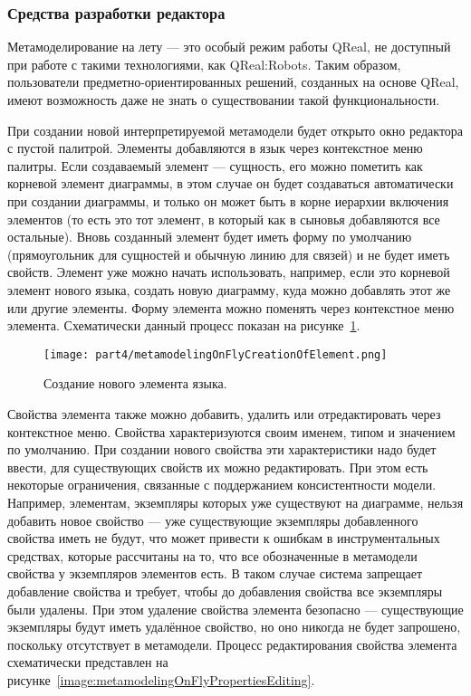 \subsubsection{Средства разработки редактора}
Метамоделирование на лету --- это особый режим работы QReal, не доступный при работе 
с такими технологиями, как QReal:Robots. Таким образом, пользователи предметно-ориентированных 
решений, созданных на основе QReal, имеют возможность даже не знать о существовании 
такой функциональности.

При создании новой интерпретируемой метамодели будет открыто окно редактора с пустой палитрой. 
Элементы добавляются в язык через контекстное меню палитры. Если создаваемый элемент --- сущность, его
можно пометить как корневой элемент диаграммы, в этом случае он будет создаваться 
автоматически при создании диаграммы, и только он может быть в корне иерархии включения 
элементов (то есть это тот элемент, в который как в сыновья добавляются все остальные). 
Вновь созданный элемент будет иметь форму по умолчанию (прямоугольник для сущностей и обычную линию для связей) и не будет 
иметь свойств. Элемент уже можно начать использовать, например, если это корневой 
элемент нового языка, создать новую диаграмму, куда можно добавлять этот же или другие элементы. Форму 
элемента можно поменять через контекстное меню элемента. Схематически данный процесс 
показан на рисунке~\ref{image:metamodelingOnFlyCreationOfElement}.

\begin{figure} [ht]
	\begin{center}
		\texttt{[image: part4/metamodelingOnFlyCreationOfElement.png]}
		\caption{Создание нового элемента языка.}
		\label{image:metamodelingOnFlyCreationOfElement}
	\end{center}
\end{figure}

Свойства элемента также можно добавить, удалить или отредактировать через контекстное 
меню. Свойства характеризуются своим именем, типом и значением по умолчанию. При создании нового свойства эти характеристики 
надо будет ввести, для существующих свойств их можно редактировать. При этом есть 
некоторые ограничения, связанные с поддержанием консистентности модели. Например, 
элементам, экземпляры которых уже существуют на диаграмме, нельзя добавить новое свойство 
--- уже существующие экземпляры добавленного свойства иметь не будут, что может привести 
к ошибкам в инструментальных средствах, которые рассчитаны на то, что все обозначенные 
в метамодели свойства у экземпляров элементов есть. В таком случае система запрещает 
добавление свойства и требует, чтобы до добавления свойства все экземпляры были удалены. 
При этом удаление свойства элемента безопасно --- существующие экземпляры будут иметь 
удалённое свойство, но оно никогда не будет запрошено, поскольку отсутствует в метамодели. 
Процесс редактирования свойства элемента схематически представлен на рисунке~\ref{image:metamodelingOnFlyPropertiesEditing}.

